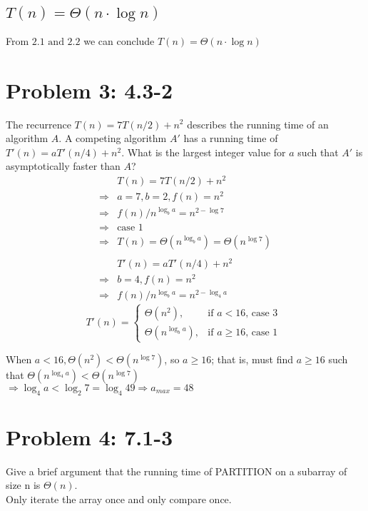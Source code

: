 \documentclass[a4paper]{article}
\begin{document}
\subsection{$T(n)= \Theta(n\cdot \log n)$}
From $2.1 \text{ and } 2.2$ we can conclude {$T(n)= \Theta(n\cdot \log n)$}

\section{Problem 3: 4.3-2} 
The recurrence $T(n)=7T(n/2)+n^2$ describes the running time of an algorithm $A$. A competing algorithm $A'$ has a running time of $T'(n)=aT'(n/4)+n^2$. What is the largest integer value for $a$ such that $A'$ is asymptotically faster than $A$?
\begin{align*}
    & T(n) = 7T (n/2)+n^2 \\
   \Rightarrow &  a=7, b=2, f(n)=n^2 \\
   \Rightarrow &  f(n)/n^{\log_b{a}}=n^{2-\log{7}}\\
   \Rightarrow & \text{case 1} \\
   \Rightarrow & T(n)=\Theta(n^{\log_b{a}})= \Theta(n^{\log{7}})\\\\
    & T'(n) = aT' (n/4)+n^2 \\
   \Rightarrow &  b=4, f(n)=n^2 \\
   \Rightarrow &  f(n)/n^{\log_b{a}}=n^{2-\log_4{a}}
\end{align*}
\begin{equation*}
T'(n) =
\begin{cases}
\Theta(n^2),  & \text{if $a<16$, case 3 } \\
\Theta(n^{\log_b{a}}), & \text{if $a\geq16$, case 1}
\end{cases}
\end{equation*}



When $a<16, \Theta(n^2)<\Theta(n^{\log{7}})$, so $a\geq16$; that is, must find $a\geq16$ such that $\Theta(n^{\log_4{a}}) < \Theta(n^{\log{7}}) $\\
$
\Rightarrow \log_4{a}<\log_2{7}=\log_4{49}\Rightarrow a_{max}=48
$

\section{Problem 4: 7.1-3} 
 Give a brief argument that the running time of PARTITION on a subarray of size n is $\Theta(n)$.\\
Only iterate the array once and only compare once.
\end{document}
